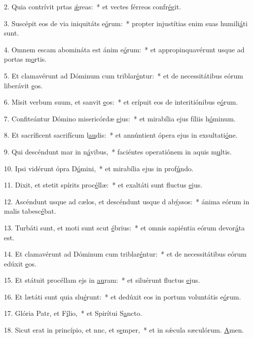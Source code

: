 2. Quia contrívit prtas \uline{ǽ}reas:~* et vectes férreos confr\uline{é}git.\par 
3. Suscépit eos de via iniquitáts e\uline{ó}rum:~* propter injustítias enim suas humili\uline{á}ti sunt.\par 
4. Omnem escam abomináta est ánim e\uline{ó}rum:~* et appropinquavérunt usque ad portas m\uline{o}rtis.\par 
5. Et clamavérunt ad Dóminum cum triblar\uline{é}ntur:~* et de necessitátibus eórum liberávit \uline{e}os.\par 
6. Misit verbum suum, et sanvit \uline{e}os:~* et erípuit eos de interitiónibus e\uline{ó}rum.\par 
7. Confiteántur Dómino misericórdæ \uline{e}jus:~* et mirabília ejus fíliis h\uline{ó}minum.\par 
8. Et sacríficent sacrifícum l\uline{au}dis:~* et annúntient ópera ejus in exsultati\uline{ó}ne.\par 
9. Qui descéndunt mar in n\uline{á}vibus,~* faciéntes operatiónem in aquis m\uline{u}ltis.\par 
10. Ipsi vidérunt ópra D\uline{ó}mini,~* et mirabília ejus in prof\uline{ú}ndo.\par 
11. Dixit, et stetit spírits proc\uline{é}llæ:~* et exaltáti sunt fluctus \uline{e}jus.\par 
12. Ascéndunt usque ad cælos, et descéndunt usque d ab\uline{ý}ssos:~* ánima eórum in malis tabesc\uline{é}bat.\par 
13. Turbáti sunt, et moti sunt scut \uline{é}brius:~* et omnis sapiéntia eórum devor\uline{á}ta est.\par 
14. Et clamavérunt ad Dóminum cum triblar\uline{é}ntur:~* et de necessitátibus eórum edúxit \uline{e}os.\par 
15. Et státuit procéllam ejs in \uline{au}ram:~* et siluérunt fluctus \uline{e}jus.\par 
16. Et lætáti sunt quia slu\uline{é}runt:~* et dedúxit eos in portum voluntátis e\uline{ó}rum.\par 
17. Glória Patr, et F\uline{í}lio,~* et Spirítui S\uline{a}ncto.\par 
18. Sicut erat in princípio, et nnc, et s\uline{e}mper,~* et in sǽcula sæculórum. \uline{A}men.\par 
